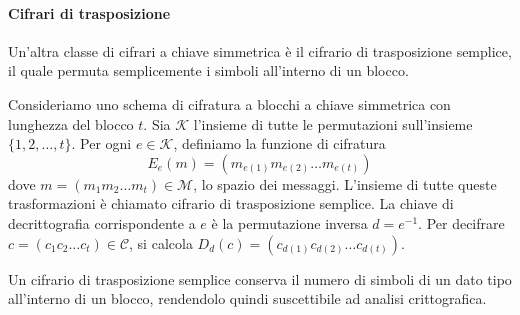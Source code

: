 \documentclass{article}
\theoremstyle{definition}
\begin{document}

\paragraph{Cifrari di trasposizione}
Un'altra classe di cifrari a chiave simmetrica è il cifrario di trasposizione semplice, il quale permuta semplicemente i simboli all'interno di un blocco.

Consideriamo uno schema di cifratura a blocchi a chiave simmetrica con lunghezza del blocco \( t \). Sia \( \mathcal{K} \) l'insieme di tutte le permutazioni sull'insieme \(\{1, 2, \ldots, t\}\). Per ogni \( e \in \mathcal{K} \), definiamo la funzione di cifratura 
\begin{equation}
    E_e(m) = (m_{e(1)} m_{e(2)} \ldots m_{e(t)})
\end{equation}
dove \( m = (m_1 m_2 \ldots m_t) \in \mathcal{M} \), lo spazio dei messaggi. L'insieme di tutte queste trasformazioni è chiamato cifrario di trasposizione semplice. La chiave di decrittografia corrispondente a \( e \) è la permutazione inversa \( d = e^{-1} \). Per decifrare \( c = (c_1 c_2 \ldots c_t) \in \mathcal{C} \), si calcola \( D_d(c) = (c_{d(1)} c_{d(2)} \ldots c_{d(t)}) \).

Un cifrario di trasposizione semplice conserva il numero di simboli di un dato tipo all'interno di un blocco, rendendolo quindi suscettibile ad analisi crittografica.
\end{document}
